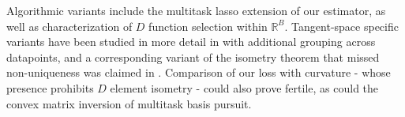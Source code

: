 Algorithmic variants include the multitask lasso \citep{ Hastie2015-qa} extension of our estimator, as well as characterization of $D$ function selection within $\mathbb R^B$.
Tangent-space specific variants have been studied in more detail in \citet{Koelle2022-ju, Koelle2024-no} with additional grouping across datapoints, and a corresponding variant of the isometry theorem that missed non-uniqueness was claimed in \citet{Koelle2022-lp}.
Comparison of our loss with curvature - whose presence prohibits $D$ element isometry - could also prove fertile, as could the convex matrix inversion of multitask basis pursuit.